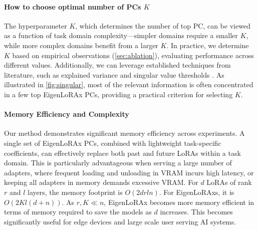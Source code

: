 \paragraph{How to choose optimal number of PCs $K$} The hyperparameter $K$, which determines the number of top PC, can be viewed as a function of task domain complexity—simpler domains require a smaller $K$, while more complex domains benefit from a larger $K$.
In practice, we determine $K$ based on empirical observations (\cref{sec:ablation}), evaluating performance across different values. Additionally, we can leverage established techniques from literature, such as explained variance and singular value thresholds \cite{gavish2014optimalhardthresholdsingular}. As illustrated in \cref{fig:singular}, most of the relevant information is often concentrated in a few top EigenLoRAx PCs, providing a practical criterion for selecting $K$.

\paragraph{Memory Efficiency and Complexity} Our method demonstrates significant memory efficiency across experiments. A single set of EigenLoRAx PCs, combined with lightweight task-specific coefficients, can effectively replace both past and future LoRAs within a task domain. This is particularly advantageous when serving a large number of adapters, where frequent loading and unloading in VRAM incurs high latency, or keeping all adapters in memory demands excessive VRAM.
For $d$ LoRAs of rank $r$ and $l$ layers, the memory footprint is $O(2drln)$. For EigenLoRAxs, it is $O(2Kl (d + n) )$. As $r, K \ll n$, EigenLoRAx becomes more memory efficient in terms of memory required to save the models as $d$ increases. This becomes significantly useful for edge devices and large scale user serving AI systems. 